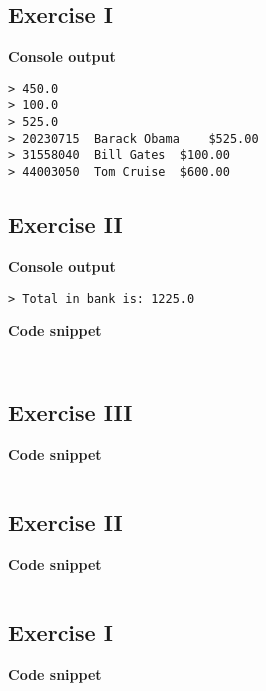 \documentclass[english,a4paper,]{report}
\begin{document}
\subsection{Exercise I}\label{exercise-i}

\textbf{Console output}

\begin{verbatim}
> 450.0
> 100.0
> 525.0
> 20230715  Barack Obama    $525.00
> 31558040  Bill Gates  $100.00
> 44003050  Tom Cruise  $600.00
\end{verbatim}

\subsection{Exercise II}\label{exercise-ii}

\textbf{Console output}

\begin{verbatim}
> Total in bank is: 1225.0
\end{verbatim}

\textbf{Code snippet}

\inputminted[firstline=28,lastline=28]{java}{code_samples/ManageAccount.java}

\inputminted[firstline=62,lastline=67]{java}{code_samples/ManageAccount.java}

\subsection{Exercise III}\label{exercise-iii}

\textbf{Code snippet}

\inputminted[firstline=32,lastline=44]{java}{code_samples/Account.java}

\subsection{Exercise II}\label{exercise-ii-1}

\textbf{Code snippet}

\inputminted[firstline=28,lastline=30]{java}{code_samples/Account.java}

\subsection{Exercise I}\label{exercise-i-1}

\textbf{Code snippet}

\inputminted[firstline=69,lastline=84]{java}{code_samples/ManageAccount.java}
\end{document}
